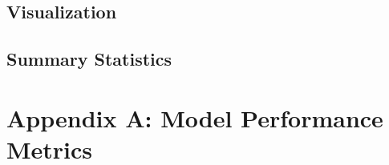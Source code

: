 \documentclass[twoside,11pt]{article}
\begin{document}
\subsection{Visualization}


\subsection{Summary Statistics}



\newpage

\section*{Appendix A: Model Performance Metrics}
\end{document}
